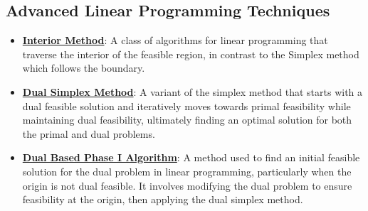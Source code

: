 \documentclass{article}%
\begin{document}
%
\subsection{Advanced Linear Programming Techniques}%
\label{subsec:AdvancedLinearProgrammingTechniques}%
\begin{itemize}[leftmargin=*]%
\item \href{https://www.math.purdue.edu/~yipn/421/2024-09-05-SimplexEfficiency.pdf#page=12}{\textbf{Interior Method}}: A class of algorithms for linear programming that traverse the interior of the feasible region, in contrast to the Simplex method which follows the boundary.%
\item \href{https://www.math.purdue.edu/~yipn/421/2024-10-03-DualSimplexMatrix.pdf#page=2}{\textbf{Dual Simplex Method}}: A variant of the simplex method that starts with a dual feasible solution and iteratively moves towards primal feasibility while maintaining dual feasibility, ultimately finding an optimal solution for both the primal and dual problems.%
\item \href{https://www.math.purdue.edu/~yipn/421/2024-10-03-DualSimplexMatrix.pdf#page=5}{\textbf{Dual Based Phase I Algorithm}}: A method used to find an initial feasible solution for the dual problem in linear programming, particularly when the origin is not dual feasible. It involves modifying the dual problem to ensure feasibility at the origin, then applying the dual simplex method.%
\end{itemize}

%
\end{document}

